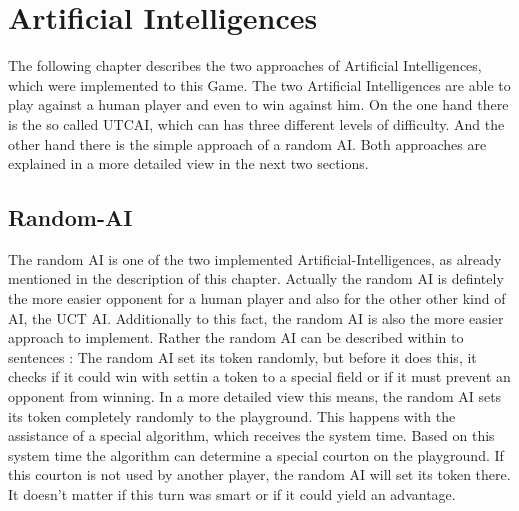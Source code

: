 \documentclass[english]{report}
\begin{document}
\chapter{Artificial Intelligences}
\label{sec:artificIntelligences}
The following chapter describes the two approaches of Artificial Intelligences, which were implemented to this Game. The two Artificial Intelligences are able 
to play against a human player and even to win against him. On the one hand there is the so called UTCAI, which can has three different
levels of difficulty. And the other hand there is the simple approach of a random AI. Both approaches are explained in a more detailed view in the next two
sections. 



\section{Random-AI}
The random AI is one of the two implemented Artificial-Intelligences, as already mentioned in the description of this chapter. 
Actually the random AI is defintely the more easier opponent for a human player and also for the other other kind of AI, the UCT AI. 
Additionally to this fact, the random AI is also the more easier approach to implement. Rather the random AI can be described within to sentences : 
The random AI set its token randomly, but before it does this, it checks if it could win with settin a token to a special field or if it must prevent an opponent from winning.
In a more detailed view this means, the random AI sets its token completely randomly to the playground. This happens with the assistance of a special algorithm, 
which receives the system time. Based on this system time the algorithm can determine a special courton on the playground. If this courton is not used by 
another player, the random AI will set its token there. It doesn't matter if this turn was smart or if it could yield an advantage. 
\end{document}
